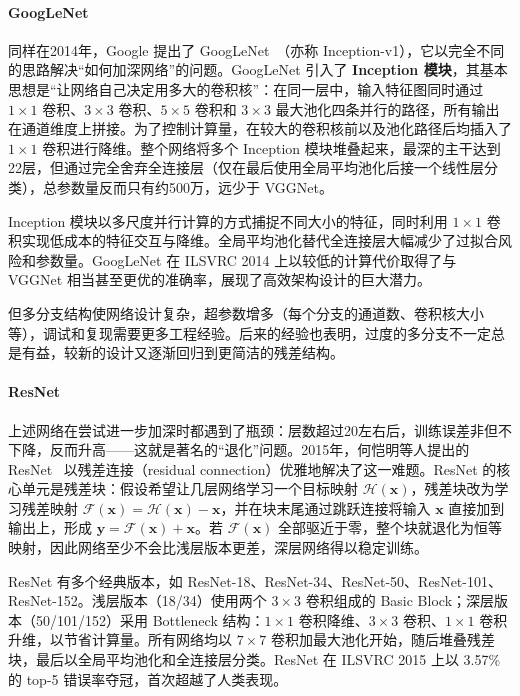 \paragraph{GoogLeNet}

同样在2014年，Google 提出了 GoogLeNet~\cite{szegedy2014goingdeeperconvolutions}（亦称 Inception-v1），它以完全不同的思路解决“如何加深网络”的问题。GoogLeNet 引入了 \textbf{Inception 模块}，其基本思想是“让网络自己决定用多大的卷积核”：在同一层中，输入特征图同时通过 $1\times1$ 卷积、$3\times3$ 卷积、$5\times5$ 卷积和 $3\times3$ 最大池化四条并行的路径，所有输出在通道维度上拼接。为了控制计算量，在较大的卷积核前以及池化路径后均插入了 $1\times1$ 卷积进行降维。整个网络将多个 Inception 模块堆叠起来，最深的主干达到22层，但通过完全舍弃全连接层（仅在最后使用全局平均池化后接一个线性层分类），总参数量反而只有约500万，远少于 VGGNet。

Inception 模块以多尺度并行计算的方式捕捉不同大小的特征，同时利用 $1\times1$ 卷积实现低成本的特征交互与降维。全局平均池化替代全连接层大幅减少了过拟合风险和参数量。GoogLeNet 在 ILSVRC 2014 上以较低的计算代价取得了与 VGGNet 相当甚至更优的准确率，展现了高效架构设计的巨大潜力。

但多分支结构使网络设计复杂，超参数增多（每个分支的通道数、卷积核大小等），调试和复现需要更多工程经验。后来的经验也表明，过度的多分支不一定总是有益，较新的设计又逐渐回归到更简洁的残差结构。

\paragraph{ResNet}

上述网络在尝试进一步加深时都遇到了瓶颈：层数超过20左右后，训练误差非但不下降，反而升高——这就是著名的“退化”问题。2015年，何恺明等人提出的 ResNet~\cite{he2015deepresiduallearningimage} 以残差连接（residual connection）优雅地解决了这一难题。ResNet 的核心单元是残差块：假设希望让几层网络学习一个目标映射 $\mathcal{H}(\mathbf{x})$，残差块改为学习残差映射 $\mathcal{F}(\mathbf{x}) = \mathcal{H}(\mathbf{x}) - \mathbf{x}$，并在块末尾通过跳跃连接将输入 $\mathbf{x} $ 直接加到输出上，形成 $\mathbf{y} = \mathcal{F}(\mathbf{x}) + \mathbf{x}$。若 $\mathcal{F}(\mathbf{x})$ 全部驱近于零，整个块就退化为恒等映射，因此网络至少不会比浅层版本更差，深层网络得以稳定训练。

ResNet 有多个经典版本，如 ResNet-18、ResNet-34、ResNet-50、ResNet-101、ResNet-152。浅层版本（18/34）使用两个 $3\times3$ 卷积组成的 Basic Block；深层版本（50/101/152）采用 Bottleneck 结构：$1\times1$ 卷积降维、$3\times3$ 卷积、$1\times1$ 卷积升维，以节省计算量。所有网络均以 $7\times7$ 卷积加最大池化开始，随后堆叠残差块，最后以全局平均池化和全连接层分类。ResNet 在 ILSVRC 2015 上以 3.57\% 的 top-5 错误率夺冠，首次超越了人类表现。

